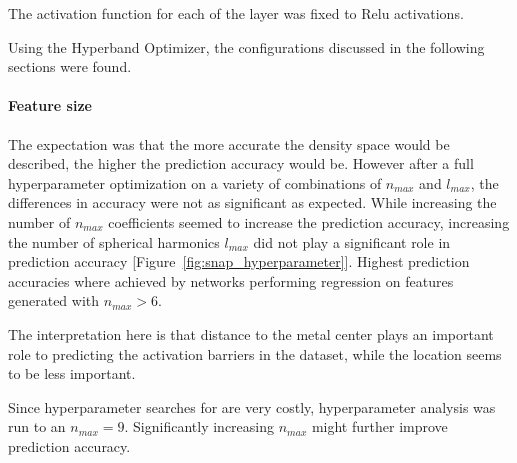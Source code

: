 The activation function for each of the layer was fixed to Relu activations.

Using the Hyperband Optimizer, the configurations discussed in the following sections were found.

\paragraph{Feature size}
The expectation was that the more accurate the density space would be described, the higher the prediction accuracy would be.
However after a full hyperparameter optimization on a variety of combinations of $n_{max}$ and $l_{max}$,
the differences in accuracy were not as significant as expected.
While increasing the number of $n_{max}$ coefficients seemed to increase the prediction accuracy,
increasing the number of spherical harmonics $l_{max}$ did not play a significant role in prediction accuracy [Figure~\ref{fig:snap_hyperparameter}].
Highest prediction accuracies where achieved by networks performing regression on features generated with $n_{max} > 6$.

The interpretation here is that distance to the metal center plays an important role to predicting the activation
barriers in the dataset, while the location seems to be less important.

Since hyperparameter searches for are very costly, hyperparameter analysis was run to an $n_{max} = 9$.
Significantly increasing $n_{max}$ might further improve prediction accuracy.

